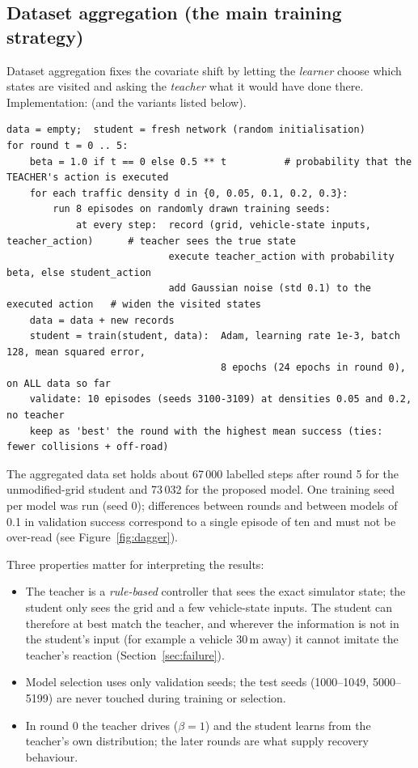 \subsection{Dataset aggregation (the main training strategy)}
Dataset aggregation fixes the covariate shift by letting the \emph{learner} choose which states are visited and asking the \emph{teacher} what it would have done there. Implementation:  (and the variants listed below).

\begin{lstlisting}[caption={Dataset aggregation as implemented (training seeds 2000--2999, validation seeds 3100--3109).},label={lst:dagger}]
data = empty;  student = fresh network (random initialisation)
for round t = 0 .. 5:
    beta = 1.0 if t == 0 else 0.5 ** t          # probability that the TEACHER's action is executed
    for each traffic density d in {0, 0.05, 0.1, 0.2, 0.3}:
        run 8 episodes on randomly drawn training seeds:
            at every step:  record (grid, vehicle-state inputs, teacher_action)      # teacher sees the true state
                            execute teacher_action with probability beta, else student_action
                            add Gaussian noise (std 0.1) to the executed action   # widen the visited states
    data = data + new records
    student = train(student, data):  Adam, learning rate 1e-3, batch 128, mean squared error,
                                     8 epochs (24 epochs in round 0), on ALL data so far
    validate: 10 episodes (seeds 3100-3109) at densities 0.05 and 0.2, no teacher
    keep as 'best' the round with the highest mean success (ties: fewer collisions + off-road)
\end{lstlisting}
The aggregated data set holds about 67\,000 labelled steps after round 5 for the unmodified-grid student and 73\,032 for the proposed model. One training seed per model was run (seed 0); differences between rounds and between models of 0.1 in validation success correspond to a single episode of ten and must not be over-read (see Figure~\ref{fig:dagger}).

Three properties matter for interpreting the results:
\begin{itemize}
\item The teacher is a \emph{rule-based} controller that sees the exact simulator state; the student only sees the grid and a few vehicle-state inputs. The student can therefore at best match the teacher, and wherever the information is not in the student's input (for example a vehicle 30\,m away) it cannot imitate the teacher's reaction (Section~\ref{sec:failure}).
\item Model selection uses only validation seeds; the test seeds (1000--1049, 5000--5199) are never touched during training or selection.
\item In round 0 the teacher drives ($\beta=1$) and the student learns from the teacher's own distribution; the later rounds are what supply recovery behaviour.
\end{itemize}

